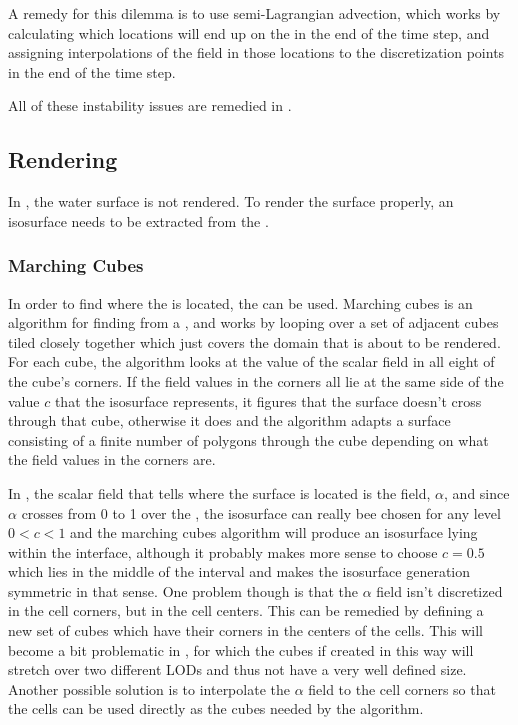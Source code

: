 A remedy for this dilemma is to use semi-Lagrangian advection, which works by calculating which locations will end up on the  in the end of the time step, and assigning interpolations of the field in those locations to the discretization points in the end of the time step.

All of these instability issues are remedied in \citep{Stam1999}.

\subsection{Rendering}

In \thisprojectwork, the water surface is not rendered. To render the surface properly, an isosurface needs to be extracted from the .

\subsubsection{Marching Cubes}

In order to find where the  is located, the   can be used. Marching cubes is an algorithm for finding \isosurfaces from a , and works by looping over a set of adjacent cubes tiled closely together which just covers the domain that is about to be rendered. For each cube, the algorithm looks at the value of the scalar field in all eight of the cube's corners. If the field values in the corners all lie at the same side of the value $c$ that the isosurface represents, it figures that the surface doesn't cross through that cube, otherwise it does and the algorithm adapts a surface consisting of a finite number of polygons through the cube depending on what the field values in the corners are.

In \thisprojectwork, the scalar field that tells where the surface is located is the  {field}, $\alpha$, and since $\alpha$ crosses from 0 to 1 over the \interface, the isosurface can really bee chosen for any level $0 < c < 1$ and the marching cubes algorithm will produce an isosurface lying within the interface, although it probably makes more sense to choose $c = 0.5$ which lies in the middle of the interval and makes the isosurface generation symmetric in that sense. One problem though is that the $\alpha$ field isn't discretized in the cell corners, but in the cell centers. This can be remedied by defining a new set of cubes which have their corners in the centers of the cells. This will become a bit problematic in , for which the cubes if created in this way will stretch over two different LODs and thus not have a very well defined size. Another possible solution is to interpolate the $\alpha$ field to the cell corners so that the cells can be used directly as the cubes needed by the algorithm.

